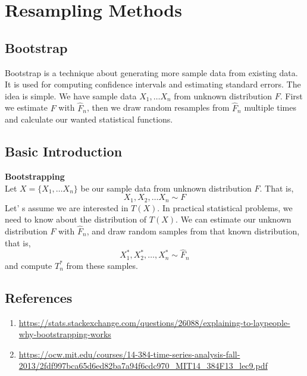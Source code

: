 \chapter{Resampling Methods}
\section{Bootstrap}
Bootstrap is a technique about generating more sample data from existing data. It is used for computing confidence intervals and estimating standard errors. The idea is simple. We have sample data $X_1, \ldots X_n$ from unknown distribution $F$. First we estimate $F$ with $\widehat{F}_n$, then we draw random resamples from $\widehat{F}_n$ multiple times and calculate our wanted statistical functions.
\section{Basic Introduction}
\begin{definition}\textbf{Bootstrapping}\\
    Let $X = \{X_1, \ldots X_n \}$ be our sample data from unknown distribution $F$. That is,
    \[X_1,X_2, \ldots X_n \sim F \]
    Let' s assume we are interested in $T(X)$. In practical statistical problems, we need to know about the distribution of $T(X)$. We can estimate our unknown distribution $F$ with $\widehat{F}_n$, and draw random samples from that known distribution, that is,
    \[X^*_1, X^*_2, \ldots, X^*_n  \sim \widehat{F}_n\]
    and compute $T^*_n$ from these samples.
\end{definition}
\section{References}
\begin{enumerate}
    \item \url{https://stats.stackexchange.com/questions/26088/explaining-to-laypeople-why-bootstrapping-works}
    \item \url{https://ocw.mit.edu/courses/14-384-time-series-analysis-fall-2013/2fdf997bca65d6ed82ba7a94f6cdc970_MIT14_384F13_lec9.pdf}
\end{enumerate}


